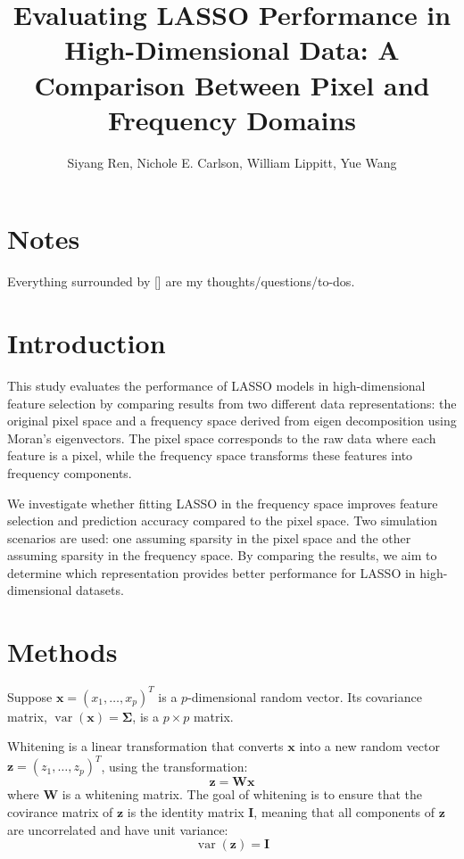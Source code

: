 \documentclass[12pt]{article}
\begin{document}
\title{Evaluating LASSO Performance in High-Dimensional Data: A Comparison Between Pixel and Frequency Domains}
\author{Siyang Ren, Nichole E. Carlson, William Lippitt, Yue Wang}
\date{}
\maketitle


\section*{Notes}

Everything surrounded by [] are my thoughts/questions/to-dos.


\section*{Introduction}

This study evaluates the performance of LASSO models in high-dimensional feature selection by comparing results from two different data representations: the original pixel space and a frequency space derived from eigen decomposition using Moran’s eigenvectors. The pixel space corresponds to the raw data where each feature is a pixel, while the frequency space transforms these features into frequency components.

We investigate whether fitting LASSO in the frequency space improves feature selection and prediction accuracy compared to the pixel space. Two simulation scenarios are used: one assuming sparsity in the pixel space and the other assuming sparsity in the frequency space. By comparing the results, we aim to determine which representation provides better performance for LASSO in high-dimensional datasets.


\section*{Methods}

Suppose \( \mathbf{x}=\left(x_1, \ldots, x_p\right)^T \) is a \( p \)-dimensional random vector. Its covariance matrix, \( \operatorname{var} (\mathbf{x}) = \boldsymbol{\Sigma} \), is a  \( p \times p \) matrix.

Whitening is a linear transformation that converts \( \mathbf{x} \) into a new random vector \( \mathbf{z}=\left(z_1, \ldots, z_p\right)^T \), using the transformation:
\[
  \mathbf{z}=\mathbf{W} \mathbf{x}
\]
where \( \mathbf{W} \) is a whitening matrix. The goal of whitening is to ensure that the covirance matrix of \( \mathbf{z} \) is the identity matrix \( \mathbf{I} \), meaning that all components of \( \mathbf{z} \) are uncorrelated and have unit variance:
\[
  \operatorname{var}(\mathbf{z})=\mathbf{I}
\]
\end{document}
